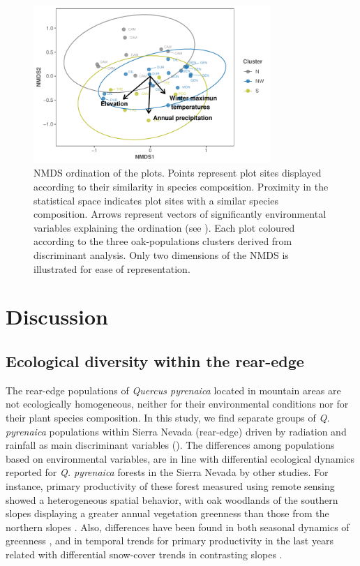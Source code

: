 \begin{figure}
\centering
\includegraphics[width=0.8\textwidth]{img/multivariante/nmds} 
\caption{NMDS ordination of the plots. Points represent plot sites displayed according to their similarity in species composition. Proximity in the statistical space indicates plot sites with a similar species composition. Arrows represent vectors of significantly environmental variables explaining the ordination (see ). Each plot coloured according to the three oak-populations clusters derived from discriminant analysis. Only two dimensions of the NMDS is illustrated for ease of representation.} 
\label{fig:nmds}
\end{figure}

\section{Discussion}\label{sec:multivar:Discussion}
\subsection{Ecological diversity within the rear-edge}\label{sec:multivar:EcolDiversity}

The rear-edge populations of \emph{Quercus pyrenaica} located in mountain areas are not ecologically homogeneous, neither for their environmental conditions nor for their plant species composition. In this study, we find separate groups of \emph{Q. pyrenaica} populations within Sierra Nevada (rear-edge) driven by radiation and rainfall as main discriminant variables (). The differences among populations based on environmental variables, are in line with differential ecological dynamics reported for \emph{Q. pyrenaica} forests in the Sierra Nevada by other studies. For instance, primary productivity of these forest measured using remote sensing showed a heterogeneous spatial behavior, with oak woodlands of the southern slopes displaying a greater annual vegetation greenness than those from the northern slopes \autocite{Dionisioetal2012SatelliteBasedMonitoring,PerezLuqueetal2015OntologicalSystem,PerezLuqueetal2020LanduseLegacies}. Also, differences have been found in both seasonal dynamics of greenness \autocite{Dionisioetal2012SatelliteBasedMonitoring}, and in temporal trends for primary productivity in the last years related with differential snow-cover trends in contrasting slopes \autocite{PerezLuqueetal2015OntologicalSystem,AlcarazSeguraetal2016ChangesVegetation}.

